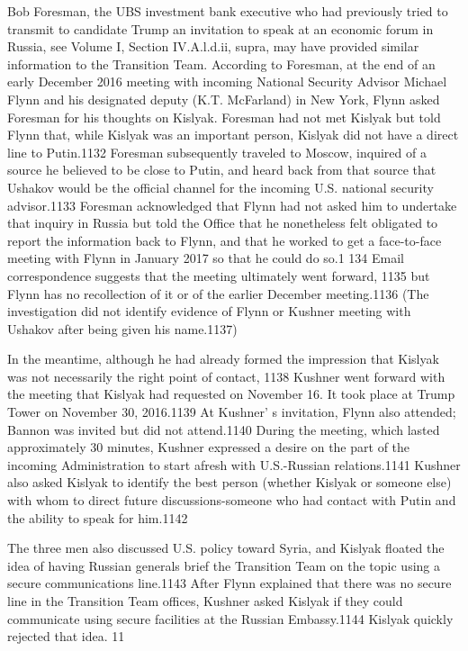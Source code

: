 Bob Foresman, the UBS investment bank executive who had previously tried to transmit to candidate Trump an invitation to speak at an economic forum in Russia, see Volume I, Section IV.A.l.d.ii, supra, may have provided similar information to the Transition Team. According to Foresman, at the end of an early December 2016 meeting with incoming National Security Advisor Michael Flynn and his designated deputy (K.T. McFarland) in New York, Flynn asked Foresman for his thoughts on Kislyak. Foresman had not met Kislyak but told Flynn that, while Kislyak was an important person, Kislyak did not have a  direct line to Putin.1132 Foresman subsequently traveled to Moscow, inquired of a  source he believed to be close to Putin, and heard back from that source that Ushakov would be the official channel for the incoming U.S. national security advisor.1133 Foresman acknowledged that Flynn had not asked him to undertake that inquiry in Russia but told the Office that he nonetheless felt obligated to report the information back to Flynn, and that he worked to get a  face-to-face meeting with Flynn in January 2017 so that he could do so.1 134 Email correspondence suggests that the meeting ultimately went forward, 1135 but Flynn has no recollection of it  or of the earlier December meeting.1136 (The investigation did not identify evidence of Flynn or Kushner meeting with Ushakov after being given his name.1137)

In the meantime,  although he had already formed the impression that Kislyak was not necessarily the right point of contact, 1138 Kushner went forward with the meeting that Kislyak had requested on November 16. It took place at Trump Tower on November 30, 2016.1139 At Kushner' s  invitation, Flynn also attended; Bannon was invited but did not attend.1140 During the meeting, which lasted approximately 30 minutes, Kushner expressed a  desire on the part of the incoming Administration to start afresh with U.S.-Russian relations.1141 Kushner also asked Kislyak to identify the best person (whether Kislyak or someone else) with whom to direct future discussions-someone who had contact with Putin and the ability to speak for him.1142

The three men also discussed U.S. policy toward Syria,  and Kislyak floated the idea of having Russian generals brief the Transition Team on the topic using a  secure communications line.1143 After Flynn explained that there was no secure line in the Transition Team offices, Kushner asked Kislyak if they could communicate using secure facilities at the Russian Embassy.1144 Kislyak quickly rejected that idea. 11

